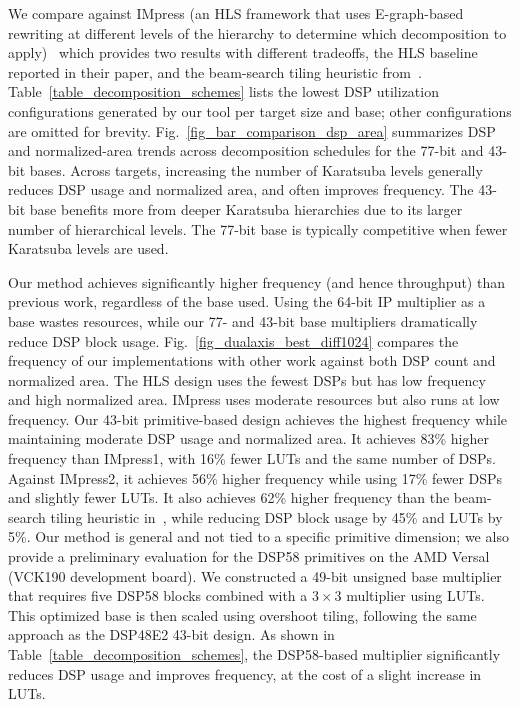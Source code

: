 \documentclass[conference]{IEEEtran}
\begin{document}
We compare against IMpress (an HLS framework that uses E-graph-based rewriting at different levels of the hierarchy to determine which decomposition to apply)~\cite{zhangIMpressLargeInteger2022} which provides two results with different tradeoffs, the HLS baseline reported in their paper, and the beam-search tiling heuristic from~\cite{kummTilingHeuristics2020}.
Table~\ref{table_decomposition_schemes} lists the lowest DSP utilization configurations generated by our tool per target size and base; other configurations are omitted for brevity.
Fig.~\ref{fig_bar_comparison_dsp_area} summarizes DSP and normalized-area trends across decomposition schedules for the 77-bit and 43-bit bases.
Across targets, increasing the number of Karatsuba levels generally reduces DSP usage and normalized area, and often improves frequency.
The 43-bit base benefits more from deeper Karatsuba hierarchies due to its larger number of hierarchical levels.
The 77-bit base is typically competitive when fewer Karatsuba levels are used.

Our method achieves significantly higher frequency (and hence throughput) than previous work, regardless of the base used.
Using the 64-bit IP multiplier as a base wastes resources, while our 77- and 43-bit base multipliers dramatically reduce DSP block usage.
Fig.~\ref{fig_dualaxis_best_diff1024} compares the frequency of our implementations with other work against both DSP count and normalized area.
The HLS design uses the fewest DSPs but has low frequency and high normalized area.
IMpress uses moderate resources but also runs at low frequency.
Our 43-bit primitive-based design achieves the highest frequency while maintaining moderate DSP usage and normalized area.
It achieves 83\% higher frequency than IMpress1, with 16\% fewer LUTs and the same number of DSPs.
Against IMpress2, it achieves 56\% higher frequency while using 17\% fewer DSPs and slightly fewer LUTs.
It also achieves 62\% higher frequency than the beam-search tiling heuristic in~\cite{kummTilingHeuristics2020}, while reducing DSP block usage by 45\% and LUTs by 5\%.
Our method is general and not tied to a specific primitive dimension; we also provide a preliminary evaluation for the DSP58 primitives on the AMD Versal (VCK190 development board). 
We constructed a 49-bit unsigned base multiplier that requires five DSP58 blocks combined with a $3\times3$ multiplier using LUTs.
This optimized base is then scaled using overshoot tiling, following the same approach as the DSP48E2 43-bit design. 
As shown in Table~\ref{table_decomposition_schemes}, the DSP58-based multiplier significantly reduces DSP usage and improves frequency, at the cost of a slight increase in LUTs.
\end{document}
